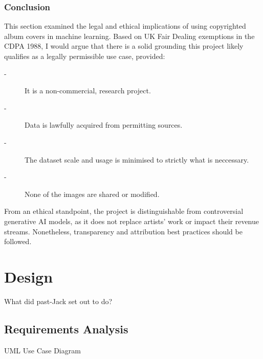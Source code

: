               \subsubsection{Conclusion}
    
                  This section examined the legal and ethical implications of using copyrighted album covers in machine learning. Based on UK Fair Dealing exemptions in the CDPA 1988, I would argue that there is a solid grounding this project likely qualifies as a legally permissible use case, provided:
                  \begin{description}
                      \item[-] It is a non-commercial, research project.
                      \item[-] Data is lawfully acquired from permitting sources.
                      \item[-] The dataset scale and usage is minimised to strictly what is neccessary.
                      \item[-] None of the images are shared or modified. %
                  \end{description}
                  
                  From an ethical standpoint, the project is distinguishable from controversial generative AI models, as it does not replace artists’ work or impact their revenue streams. Nonetheless, transparency and attribution best practices should be followed.
    
    \section{Design} %
        \begin{temp}
            What did past-Jack set out to do?
        \end{temp}
        
        \subsection{Requirements Analysis}
    
            \begin{temp}
                UML Use Case Diagram
            \end{temp}
        
